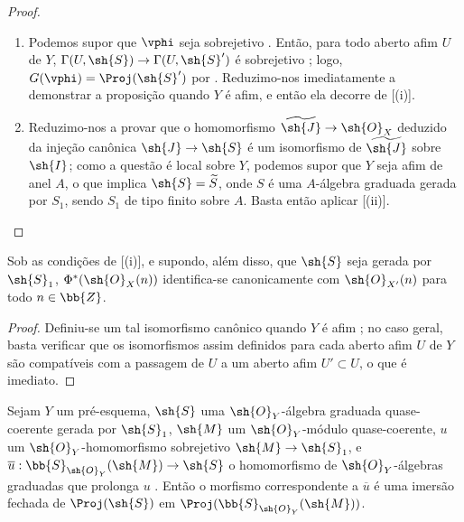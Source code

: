 \documentclass[oneside,10pt]{amsart}
\makeatletter
\newcommand{\ega@arrow}[2]{\mathchoice{#1}{#2}{#2}{#2}}
\renewcommand{\to}{\ega@arrow{\longrightarrow}{\rightarrow}}
\let\EGAOriginalLabel\label
\renewcommand{\label}[1]{\phantomsection\EGAOriginalLabel{#1}}
\makeatother
\begin{document}
\begin{proof}
\medskip\noindent
\begin{enumerate}
  \item[(i)] Podemos supor que $\vphi$ seja sobrejetivo .
    Então, para todo aberto afim $U$ de $Y$, $\Gamma(U,\sh{S})\to\Gamma(U,\sh{S}')$ é sobrejetivo ; logo, $G(\vphi)=\Proj(\sh{S}')$ por .
    Reduzimo-nos imediatamente a demonstrar a proposição quando $Y$ é afim, e então ela decorre de [(i)].
  \item[(ii)] Reduzimo-nos a provar que o homomorfismo $\widetilde{\sh{J}}\to\sh{O}_X$ deduzido da injeção canônica $\sh{J}\to\sh{S}$ é um isomorfismo de $\widetilde{\sh{J}}$ sobre $\sh{I}$;
    como a questão é local sobre $Y$, podemos supor que $Y$ seja afim de anel $A$, o que implica $\sh{S}=\widetilde{S}$, onde $S$ é uma $A$-álgebra graduada gerada por $S_1$, sendo $S_1$ de tipo finito sobre $A$.
    Basta então aplicar [(ii)].
\end{enumerate}
\end{proof}

\begin{corollary}[3.6.3]
\label{II.3.6.3}
Sob as condições de [(i)], e supondo, além disso, que $\sh{S}$ seja gerada por $\sh{S}_1$, $\Phi^*(\sh{O}_X(n))$ identifica-se canonicamente com $\sh{O}_{X'}(n)$ para todo $n\in\bb{Z}$.
\end{corollary}

\begin{proof}
Definiu-se um tal isomorfismo canônico quando $Y$ é afim ;
no caso geral, basta verificar que os isomorfismos assim definidos para cada aberto afim $U$ de $Y$ são compatíveis com a passagem de $U$ a um aberto afim $U'\subset U$, o que é imediato.
\end{proof}

\begin{corollary}[3.6.4]
\label{II.3.6.4}
Sejam $Y$ um pré-esquema, $\sh{S}$ uma $\sh{O}_Y$-álgebra graduada quase-coerente gerada por $\sh{S}_1$, $\sh{M}$ um $\sh{O}_Y$-módulo quase-coerente, $u$ um $\sh{O}_Y$-homomorfismo sobrejetivo $\sh{M}\to\sh{S}_1$, e $\overline{u}:\bb{S}_{\sh{O}_Y}(\sh{M})\to\sh{S}$ o homomorfismo de $\sh{O}_Y$-álgebras graduadas que prolonga $u$ .
Então o morfismo correspondente a $\overline{u}$ é uma imersão fechada de $\Proj(\sh{S})$ em $\Proj(\bb{S}_{\sh{O}_Y}(\sh{M}))$.
\end{corollary}
\end{document}
